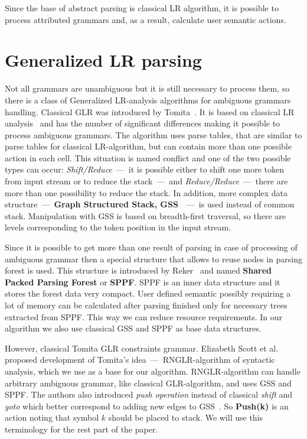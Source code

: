 \documentclass{sigplanconf}
\begin{document}
Since the base of abstract parsing is classical LR algorithm, it is possible to process attributed grammars and, as a result, calculate user semantic actions.

\section{Generalized LR parsing}

Not all grammars are unambiguous but it is still necessary to process them, so there is a class of Generalized LR-analysis algorithms for ambiguous grammars handling. Classical GLR was introduced by Tomita~\cite{Tomita}. It is based on classical LR analysis~\cite{Grune} and has the number of significant differences making it possible to process ambiguous grammars. The algorithm uses parse tables, that are similar to parse tables for classical LR-algorithm, but can contain more than one possible action in each cell. This situation is named conflict and one of the two possible types can occur: {\it Shift/Reduce}~---~it is possible either to shift one more token from input stream or to reduce the stack~---~and {\it Reduce/Reduce}~---~there are more than one possibility to reduce the stack. In addition, more complex data structure~---~{\bf Graph Structured Stack, GSS}~\cite{Tomita}~---~is used instead of common stack. Manipulation with GSS is based on breadth-first traversal, so there are levels corresponding to the token position in the input stream.

Since it is possible to get more than one result of parsing in case of processing of ambiguous grammar then a special structure that allows to reuse nodes in parsing forest is used. This structure is introduced by Reker~\cite{SPPF} and named {\bf Shared Packed Parsing Forest} or {\bf SPPF}. SPPF is an inner data structure and it stores the forest data very compact. User defined semantic possibly requiring a lot of memory can be calculated after parsing finished only for necessary trees extracted from SPPF. This way we can reduce resource requirements. In our algorithm we also use classical GSS and SPPF as base data structures.

However, classical Tomita GLR constraints grammar. Elizabeth Scott et al.~\cite{RNGLR} proposed development of Tomita's idea~---~RNGLR-algorithm of syntactic analysis, which we use as a base for our algorithm. RNGLR-algorithm can handle arbitrary ambiguous grammar, like classical GLR-algorithm, and uses GSS and SPPF. The authors also introduced {\it push operation} instead of classical {\it shift} and {\it goto} which better correspond to adding new edges to GSS~\cite{RNGLR}. So {\bf Push(k)} is an action noting that symbol $k$ should be placed to stack. We will use this terminology for the rest part of the paper.
\end{document}
